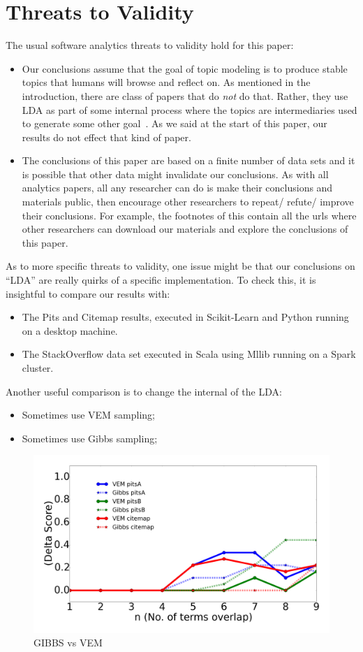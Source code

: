 \documentclass[10pt,conference]{IEEEtran}
\newcommand{\bi}{\begin{itemize}}
\newcommand{\ei}{\end{itemize}}
\theoremstyle{break}
\begin{document}
 

\section{Threats to Validity}
\label{sect: validity}
The usual software analytics threats to validity hold for this paper:
\bi
\item
  Our conclusions assume that the goal of topic modeling is to produce stable topics
  that humans will browse and reflect on. As mentioned in the introduction, there are
  class of papers that do {\em not} do that. Rather, they use LDA as part of some internal
  process where the topics are intermediaries
  used to generate some other goal~\cite{chen2016topic}. As we said at the start
    of this paper, our results do not effect that kind of paper.
\item
The conclusions of this paper are based on a finite number of data sets and it is possible
that other data might invalidate our conclusions. As with all analytics papers,
all any researcher can do is make their conclusions and materials public, then encourage
other researchers to repeat/ refute/ improve their conclusions. For example, the footnotes of this contain all the urls where other researchers can download
our materials and explore the conclusions of this paper.
\ei

As to more specific threats to validity, one issue might be that our conclusions
on ``LDA'' are really quirks of a specific implementation.
To check this, it is insightful to compare our results with:
\bi
\item The Pits and Citemap results, executed in Scikit-Learn and Python running on
  a desktop machine.
\item The StackOverflow data set executed in Scala using Mllib running on a Spark cluster.
  \ei
  Another useful comparison is to change the internal of the LDA:
  \bi
\item Sometimes use VEM sampling;
\item Sometimes use Gibbs sampling;
  \ei

\begin{figure}[!b]
  \captionsetup{justification=centering}
  \includegraphics[width=\linewidth]{./fig/gibbs_vem1.png}
  \caption{GIBBS vs VEM}
  \label{gibbs_vem}
\end{figure}
\end{document}
